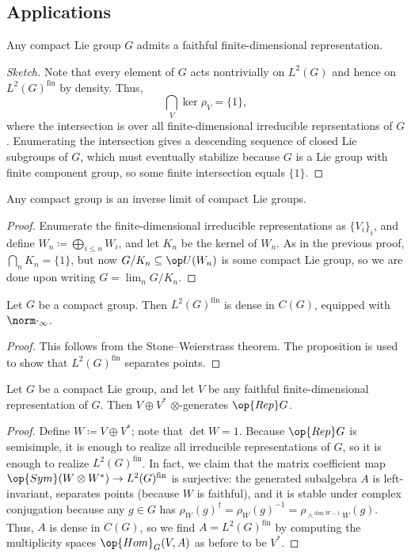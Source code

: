 \documentclass{article}
\begin{document}
\subsection{Applications}
\begin{proposition}
	Any compact Lie group $G$ admits a faithful finite-dimensional representation.
\end{proposition}
\begin{proof}[Sketch]
	Note that every element of $G$ acts nontrivially on $L^2(G)$ and hence on $L^2(G)^{\mathrm{fin}}$ by density. Thus,
	\[\bigcap_V\ker\rho_V=\{1\},\]
	where the intersection is over all finite-dimensional irreducible reprsentations of $G$. Enumerating the intersection gives a descending sequence of closed Lie subgroups of $G$, which must eventually stabilize because $G$ is a Lie group with finite component group, so some finite intersection equals $\{1\}$.
\end{proof}
\begin{proposition}
	Any compact group is an inverse limit of compact Lie groups.
\end{proposition}
\begin{proof}
	Enumerate the finite-dimensional irreducible representations as $\{V_i\}_i$, and define $W_n\coloneqq\bigoplus_{i\le n}W_i$, and let $K_n$ be the kernel of $W_n$. As in the previous proof, $\bigcap_nK_n=\{1\}$, but now $G/K_n\subseteq\op U(W_n)$ is some compact Lie group, so we are done upon writing $G=\lim_nG/K_n$. 
\end{proof}
\begin{corollary}
	Let $G$ be a compact group. Then $L^2(G)^{\mathrm{fin}}$ is dense in $C(G)$, equipped with $\norm\cdot_\infty$.
\end{corollary}
\begin{proof}
	This follows from the Stone--Weierstrass theorem. The proposition is used to show that $L^2(G)^{\mathrm{fin}}$ separates points.
\end{proof}
\begin{corollary}
	Let $G$ be a compact Lie group, and let $V$ be any faithful finite-dimensional representation of $G$. Then $V\oplus V^*$ $\otimes$-generates $\op{Rep}G$.
\end{corollary}
\begin{proof}
	Define $W\coloneqq V\oplus V^*$; note that $\det W=1$. Because $\op{Rep}G$ is semisimple, it is enough to realize all irreducible representations of $G$, so it is enough to realize $L^2(G)^{\mathrm{fin}}$. In fact, we claim that the matrix coefficient map $\op{Sym}(W\otimes W^*)\to L^2(G)^{\mathrm{fin}}$ is surjective: the generated subalgebra $A$ is left-invariant, separates points (because $W$ is faithful), and it is stable under complex conjugation because any $g\in G$ has $\rho_W(g)^\dagger=\rho_W(g)^{-1}=\rho_{\land^{\dim W-1}W}(g)$. Thus, $A$ is dense in $C(G)$, so we find $A=L^2(G)^{\mathrm{fin}}$ by computing the multiplicity spaces $\op{Hom}_G(V,A)$ as before to be $V^*$.
\end{proof}
\end{document}
